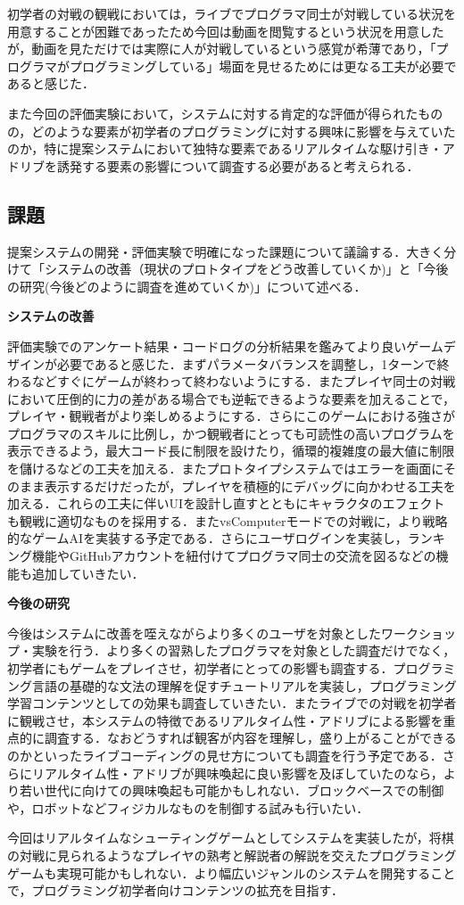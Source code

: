 初学者の対戦の観戦においては，ライブでプログラマ同士が対戦している状況を用意することが困難であったため今回は動画を閲覧するという状況を用意したが，動画を見ただけでは実際に人が対戦しているという感覚が希薄であり，「プログラマがプログラミングしている」場面を見せるためには更なる工夫が必要であると感じた．

また今回の評価実験において，システムに対する肯定的な評価が得られたものの，どのような要素が初学者のプログラミングに対する興味に影響を与えていたのか，特に提案システムにおいて独特な要素であるリアルタイムな駆け引き・アドリブを誘発する要素の影響について調査する必要があると考えられる．

\subsection{課題}
提案システムの開発・評価実験で明確になった課題について議論する．大きく分けて「システムの改善（現状のプロトタイプをどう改善していくか)」と「今後の研究(今後どのように調査を進めていくか)」について述べる．

\noindent
{\bf システムの改善}

評価実験でのアンケート結果・コードログの分析結果を鑑みてより良いゲームデザインが必要であると感じた．まずパラメータバランスを調整し，1ターンで終わるなどすぐにゲームが終わって終わないようにする．またプレイヤ同士の対戦において圧倒的に力の差がある場合でも逆転できるような要素を加えることで，プレイヤ・観戦者がより楽しめるようにする．さらにこのゲームにおける強さがプログラマのスキルに比例し，かつ観戦者にとっても可読性の高いプログラムを表示できるよう，最大コード長に制限を設けたり，循環的複雑度の最大値に制限を儲けるなどの工夫を加える．またプロトタイプシステムではエラーを画面にそのまま表示するだけだったが，プレイヤを積極的にデバッグに向かわせる工夫を加える．これらの工夫に伴いUIを設計し直すとともにキャラクタのエフェクトも観戦に適切なものを採用する．またvsComputerモードでの対戦に，より戦略的なゲームAIを実装する予定である．さらにユーザログインを実装し，ランキング機能やGitHubアカウントを紐付けてプログラマ同士の交流を図るなどの機能も追加していきたい．

\noindent
{\bf 今後の研究}

今後はシステムに改善を咥えながらより多くのユーザを対象としたワークショップ・実験を行う．より多くの習熟したプログラマを対象とした調査だけでなく，初学者にもゲームをプレイさせ，初学者にとっての影響も調査する．プログラミング言語の基礎的な文法の理解を促すチュートリアルを実装し，プログラミング学習コンテンツとしての効果も調査していきたい．またライブでの対戦を初学者に観戦させ，本システムの特徴であるリアルタイム性・アドリブによる影響を重点的に調査する．なおどうすれば観客が内容を理解し，盛り上がることができるのかといったライブコーディングの見せ方についても調査を行う予定である．さらにリアルタイム性・アドリブが興味喚起に良い影響を及ぼしていたのなら，より若い世代に向けての興味喚起も可能かもしれない．ブロックベースでの制御や，ロボットなどフィジカルなものを制御する試みも行いたい．

今回はリアルタイムなシューティングゲームとしてシステムを実装したが，将棋の対戦に見られるようなプレイヤの熟考と解説者の解説を交えたプログラミングゲームも実現可能かもしれない．より幅広いジャンルのシステムを開発することで，プログラミング初学者向けコンテンツの拡充を目指す．



